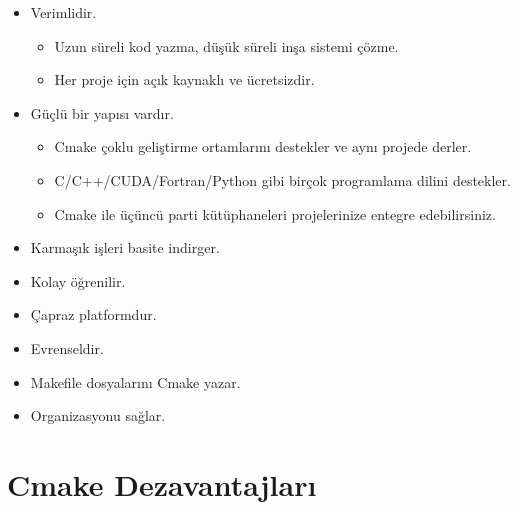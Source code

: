 \documentclass[
]{book}
\providecommand{\tightlist}{%
  \setlength{\itemsep}{0pt}\setlength{\parskip}{0pt}}
\begin{document}
\begin{itemize}
\tightlist
\item
  Verimlidir.

  \begin{itemize}
  \tightlist
  \item
    Uzun süreli kod yazma, düşük süreli inşa sistemi çözme.
  \item
    Her proje için açık kaynaklı ve ücretsizdir.
  \end{itemize}
\item
  Güçlü bir yapısı vardır.

  \begin{itemize}
  \tightlist
  \item
    Cmake çoklu geliştirme ortamlarını destekler ve aynı projede derler.
  \item
    C/C++/CUDA/Fortran/Python gibi birçok programlama dilini destekler.
  \item
    Cmake ile üçüncü parti kütüphaneleri projelerinize entegre edebilirsiniz.
  \end{itemize}
\item
  Karmaşık işleri basite indirger.
\item
  Kolay öğrenilir.
\item
  Çapraz platformdur.
\item
  Evrenseldir.
\item
  Makefile dosyalarını Cmake yazar.
\item
  Organizasyonu sağlar.
\end{itemize}

\hypertarget{cmake-dezavantajlarux131}{%
\section{Cmake Dezavantajları}\label{cmake-dezavantajlarux131}}
\end{document}
